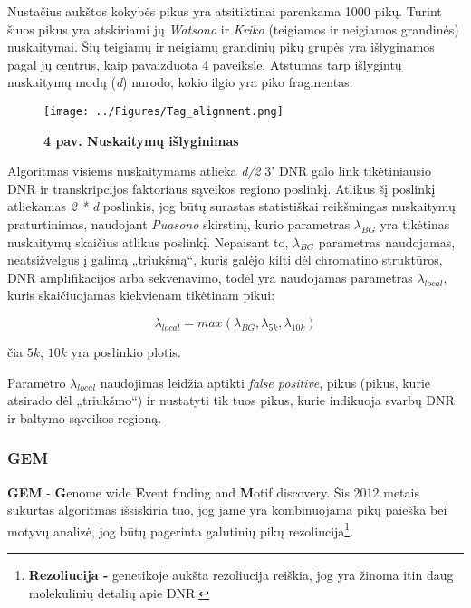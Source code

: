 \documentclass[12pt]{article}
\begin{document}
Nustačius aukštos kokybės pikus yra atsitiktinai parenkama 1000 pikų. Turint
šiuos pikus yra atskiriami jų \emph{Watsono} ir \emph{Kriko} (teigiamos ir
neigiamos grandinės) nuskaitymai.
Šių teigiamų ir neigiamų grandinių pikų grupės yra išlyginamos pagal jų
centrus, kaip pavaizduota 4 paveiksle. Atstumas tarp išlygintų nuskaitymų
modų (\emph{d}) nurodo, kokio ilgio yra piko fragmentas.

\begin{figure}[H]
    \begin{center}
        \texttt{[image: ../Figures/Tag\_alignment.png]}
        \caption*{\small\textbf{4 pav. Nuskaitymų išlyginimas}}
        \label{fig:birds}
    \end{center}
\end{figure}

Algoritmas visiems nuskaitymams atlieka \emph{d/2} 3' DNR galo link
tikėtiniausio DNR ir transk\-rip\-ci\-jos faktoriaus sąveikos regiono poslinkį.
Atlikus šį poslinkį atliekamas \emph{2 * d} poslinkis, jog būtų surastas
statistiškai reikšmingas nuskaitymų praturtinimas, naudojant \emph{Puasono}
skirstinį, kurio parametras \(\lambda_{BG}\) yra tikėtinas nuskaitymų skaičius
atlikus poslinkį. Nepaisant to, \(\lambda_{BG}\) parametras naudojamas,
neatsižvelgus į galimą „triukšmą“, kuris galėjo kilti dėl chromatino struktūros,
DNR amplifikacijos arba sekvenavimo, todėl yra naudojamas parametras
\(\lambda_{local}\), kuris skaičiuojamas kiekvienam tikėtinam
pikui:

\begin{equation} \label{lambda_local}
    \lambda_{local} = max(\lambda_{BG}, \lambda_{5k}, \lambda_{10k})
\end{equation}

čia \(5k\), \(10k\) yra poslinkio plotis.

Parametro \(\lambda_{local}\) naudojimas leidžia aptikti \emph{false positive},
pikus (pikus, kurie atsirado dėl „triukšmo“) ir nustatyti tik tuos pikus,
kurie indikuoja svarbų DNR ir baltymo sąveikos regioną\cite{ARTICLE12}.
  
\subsubsection{GEM}
\textbf{GEM} - \textbf{G}enome wide \textbf{E}vent finding and \textbf{M}otif
discovery. Šis 2012 metais sukurtas algoritmas išsiskiria tuo, jog jame yra
kombinuojama pikų paieška bei motyvų analizė, jog būtų pagerinta galutinių pikų
rezoliucija\footnote{\textbf{Rezoliucija - } genetikoje aukšta rezoliucija
reiškia, jog yra žinoma itin daug molekulinių detalių apie DNR.}.\\
\end{document}
